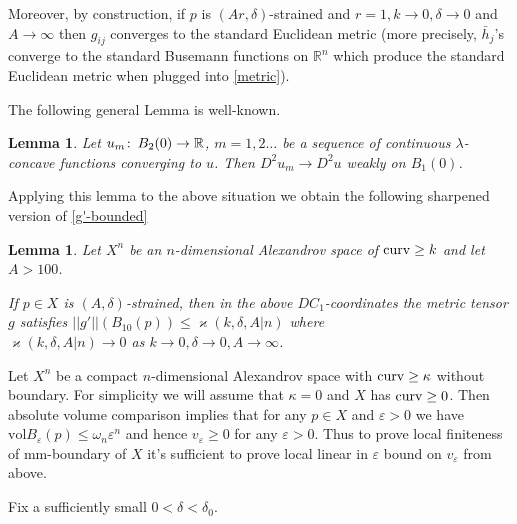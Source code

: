 \documentclass[12pt,leqno]{amsart}
\numberwithin{equation}{section}
\newtheorem{lem}[thm]{Lemma}
\theoremstyle{definition}
\theoremstyle{remark}
\newcommand{\vol}{\mathrm{vol}}
\newcommand{\R}{\mathbb{R}}
\def\co{\colon\thinspace}
\def\eps{\varepsilon}
\newcommand{\curv}{\mathop{\rm curv}}
\begin{document}
Moreover, by construction, if $p$ is $(Ar,\delta)$-strained and $r=1,k\to 0,\delta\to 0$ and $A\to\infty$ then $g_{ij}$ converges to the standard Euclidean metric (more precisely, $\bar h_j$'s converge to the standard Busemann functions on $\R^n$ which produce the standard Euclidean metric when plugged into \eqref{metric}).



The following general Lemma is well-known.
\begin{lem}\label{concave-der-conv}
Let $u_m\co B_2(0)\to\R$, $m=1,2\ldots$ be a sequence of continuous $\lambda$-concave functions converging to $u$.
Then $D^2u_m\to D^2 u$ weakly on $B_1(0)$.
\end{lem}

Applying this lemma to the above situation we obtain the following sharpened version of \eqref{g'-bounded}

 \begin{lem}\label{lem-per-dc-1}
 Let $X^n$ be an $n$-dimensional Alexandrov space of $\curv\ge k$ and let $A>100$.

 If  $p\in X$ is
   $(A,\delta)$-strained, then  in the above $DC_1$-coordinates
the metric tensor $g$ satisfies $||g'|| (B_{10}(p)) \leq \varkappa( k,\delta,A| n)$ where\\ $\varkappa(k,\delta,A| n)\to 0$ as $k\to 0, \delta\to 0,A\to\infty$.
 \end{lem}



 Let $X^n$ be a compact  $n$-dimensional Alexandrov space with $\curv\ge\kappa$ without boundary. For simplicity we will assume that  $\kappa=0$ and $X$ has $\curv\ge 0$.
 Then absolute volume comparison implies that for any $p\in X$ and $\eps>0$ we have $\vol B_\eps(p)\le \omega_n\eps^n$ and hence $v_\eps\ge 0$ for any $\eps>0$. Thus to prove local finiteness of mm-boundary of $X$ it's sufficient to prove local linear in $\eps$ bound on $v_\eps$ from above.

 Fix a sufficiently small $0<\delta<\delta_0$.


\end{document}
